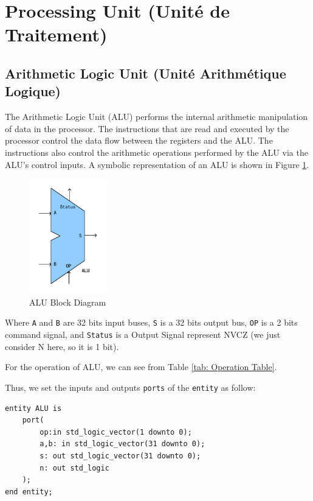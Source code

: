 \section{Processing Unit (Unité de Traitement)}

\subsection{Arithmetic Logic Unit (Unité Arithmétique Logique)}

The Arithmetic Logic Unit (ALU) performs the internal arithmetic manipulation of data 
in the processor. The instructions that are read and executed by the processor control 
the data flow between the registers and the ALU. The instructions also control the 
arithmetic operations performed by the ALU via the ALU’s control inputs. 
A symbolic representation of an ALU is shown in Figure \ref{fig:ALU}.

\begin{figure}[h]
    \centering
    \includegraphics[width=0.3\textwidth]{picture/ALU.pdf}
    \caption{ALU Block Diagram}     
    \label{fig:ALU}
\end{figure}

Where \texttt{A} and \texttt{B} are 32 bits input buses, 
\texttt{S} is a 32 bits output bus, 
\texttt{OP} is a 2 bits command signal, 
and \texttt{Status} is a Output Signal represent NVCZ (we just consider N here, so it is 1 bit).

For the operation of ALU, we can see from Table \ref{tab: Operation Table}.

Thus, we set the inputs and outputs \texttt{ports} of the \texttt{entity} as follow:
\begin{lstlisting}[style=vhdl,columns=fullflexible]
entity ALU is
    port(
        op:in std_logic_vector(1 downto 0);
        a,b: in std_logic_vector(31 downto 0);
        s: out std_logic_vector(31 downto 0);
        n: out std_logic
    );
end entity;
\end{lstlisting}
    
